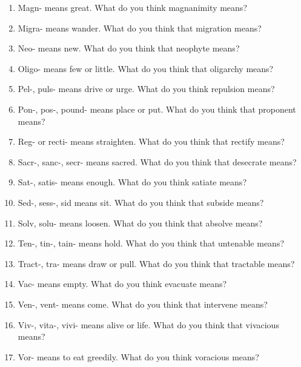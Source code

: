 \documentclass[12pt]{book}
\begin{document}
\begin{enumerate}
\item Magn- means great. What do you think magnanimity means?\\
\item Migra- means wander. What do you think that migration means?\\
\item Neo- means new. What do you think that neophyte means?\\
\item Oligo- means few or little. What do you think that oligarchy means?\\
\item Pel-, puls- means drive or urge. What do you think repulsion means?\\
\item Pon-, pos-, pound- means place or put. What do you think that proponent means?\\
\item Reg- or recti- means straighten. What do you think that rectify means?\\
\item Sacr-, sanc-, secr- means sacred. What do you think that desecrate means?\\
\item Sat-, satis- means enough. What do you think satiate means?\\
\item Sed-, sess-, sid means sit. What do you think that subside means?\\
\item Solv, solu- means loosen. What do you think that absolve means?\\
\item Ten-, tin-, tain- means hold. What do you think that untenable means?\\
\item Tract-, tra- means draw or pull. What do you think that tractable means?\\
\item Vac- means empty. What do you think evacuate means?\\
\item Ven-, vent- means come. What do you think that intervene means?\\
\item Viv-, vita-, vivi- means alive or life. What do you think that vivacious means?\\
\item Vor- means to eat greedily. What do you think voracious means?
\end{enumerate}
\end{document}
